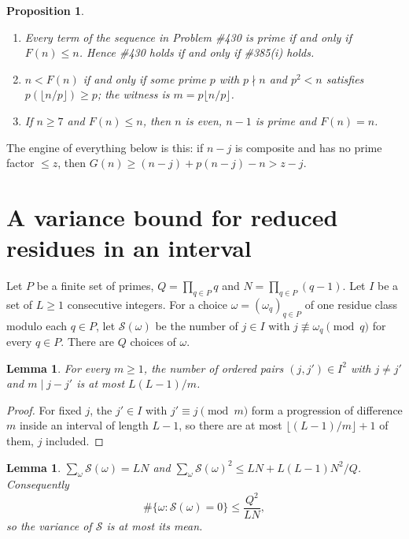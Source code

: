 \documentclass[11pt,letterpaper]{article}
\newtheorem{proposition}[theorem]{Proposition}
\newtheorem{lemma}[theorem]{Lemma}
\theoremstyle{remark}
\newcommand{\cS}{\mathcal S}
\begin{document}
\begin{proposition}\label{prop:red}
\begin{enumerate}
\item Every term of the sequence in Problem \#430 is prime if and only if
$F(n)\le n$. Hence \#430 holds if and only if \#385(i) holds.
\item $n<F(n)$ if and only if some prime $p$ with $p\nmid n$ and $p^2<n$
satisfies $p(\lfloor n/p\rfloor)\ge p$; the witness is $m=p\lfloor n/p\rfloor$.
\item If $n\ge 7$ and $F(n)\le n$, then $n$ is even, $n-1$ is prime and
$F(n)=n$.
\end{enumerate}
\end{proposition}

The engine of everything below is this: if $n-j$ is composite and has no
prime factor $\le z$, then $G(n)\ge (n-j)+p(n-j)-n>z-j$.

\section{A variance bound for reduced residues in an interval}

Let $P$ be a finite set of primes, $Q=\prod_{q\in P}q$ and
$N=\prod_{q\in P}(q-1)$. Let $I$ be a set of $L\ge1$ consecutive integers. For a
choice $\omega=(\omega_q)_{q\in P}$ of one residue class modulo each $q\in P$,
let $\cS(\omega)$ be the number of $j\in I$ with $j\not\equiv\omega_q\pmod q$ for
every $q\in P$. There are $Q$ choices of $\omega$.

\begin{lemma}\label{lem:pairs}
For every $m\ge1$, the number of ordered pairs $(j,j')\in I^2$ with $j\ne j'$
and $m\mid j-j'$ is at most $L(L-1)/m$.
\end{lemma}

\begin{proof}
For fixed $j$, the $j'\in I$ with $j'\equiv j\pmod m$ form a progression of
difference $m$ inside an interval of length $L-1$, so there are at most
$\lfloor (L-1)/m\rfloor+1$ of them, $j$ included.
\end{proof}

\begin{lemma}\label{lem:var}
$\sum_\omega \cS(\omega)=LN$ and
$\sum_\omega \cS(\omega)^2\le LN+L(L-1)N^2/Q$. Consequently
\[
\#\{\omega:\cS(\omega)=0\}\le \frac{Q^2}{LN},
\]
so the variance of $\cS$ is at most its mean.
\end{lemma}
\end{document}
